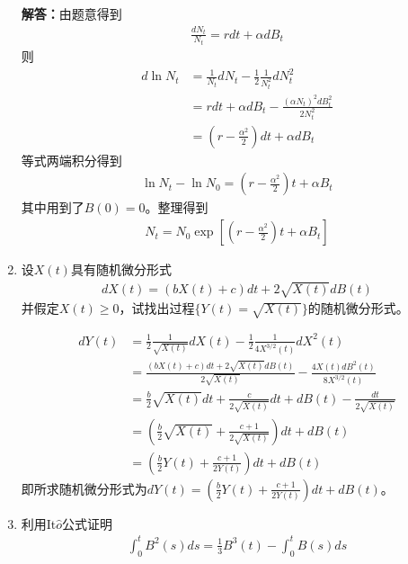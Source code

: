 \begin{enumerate}
	      \textbf{解答：}由题意得到
	      \begin{align*}
		      \frac{dN_t}{N_t}=rdt+\alpha dB_t
	      \end{align*}
	      则
	      \begin{align*}
		      d\ln N_t & =\frac{1}{N_t}dN_t-\frac{1}{2}\frac{1}{N_t^2}dN_t^2  \\
		               & =rdt+\alpha dB_t-\frac{(\alpha N_t)^2dB_t^2}{2N_t^2} \\
		               & =(r-\frac{\alpha^2}{2})dt+\alpha dB_t
	      \end{align*}
	      等式两端积分得到
	      \begin{align*}
		      \ln N_t-\ln N_0=(r-\frac{\alpha^2}{2})t+\alpha B_t
	      \end{align*}
	      其中用到了\(B(0)=0\)。整理得到
	      \begin{align*}
		      N_t=N_0\exp \left[(r-\frac{\alpha^2}{2})t+\alpha B_t \right]
	      \end{align*}
	\item 设\(X(t)\)具有随机微分形式
	      \begin{align*}
		      dX(t)=(bX(t)+c)dt+2\sqrt{X(t)}dB(t)
	      \end{align*}
	      并假定\(X(t)\geqslant0\)，试找出过程\(\{Y(t)=\sqrt{X(t)}\}\)的随机微分形式。

	      \begin{align*}
		      dY(t) & =\frac{1}{2}\frac{1}{\sqrt{X(t)}}dX(t)-\frac{1}{2}\frac{1}{4X^{3/2}(t)}dX^2(t)       \\
		            & =\frac{(bX(t)+c)dt+2\sqrt{X(t)}dB(t)}{2\sqrt{X(t)}}-\frac{4X(t)dB^2(t)}{8X^{3/2}(t)} \\
		            & =\frac{b}{2}\sqrt{X(t)}dt+\frac{c}{2\sqrt{X(t)}}dt+dB(t)-\frac{dt}{2\sqrt{X(t)}}     \\
		            & =(\frac{b}{2}\sqrt{X(t)}+\frac{c+1}{2\sqrt{X(t)}})dt+dB(t)                           \\
		            & =(\frac{b}{2}Y(t)+\frac{c+1}{2Y(t)})dt+dB(t)
	      \end{align*}
	      即所求随机微分形式为\(dY(t)=(\frac{b}{2}Y(t)+\frac{c+1}{2Y(t)})dt+dB(t)\)。
	\item 利用It\(\hat{o}\)公式证明
	      \begin{align*}
		      \int_{0}^{t}B^2(s)ds=\frac{1}{3}B^3(t)-\int_{0}^{t}B(s)ds
	      \end{align*}


\end{enumerate}
